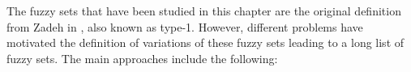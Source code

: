 
The fuzzy sets that have been studied in this chapter are the original definition from Zadeh in \cite{Zadeh1965}, also known as type-1. However, different problems have motivated the definition of variations of these fuzzy sets leading to a long list of fuzzy sets. The main approaches include the following:






